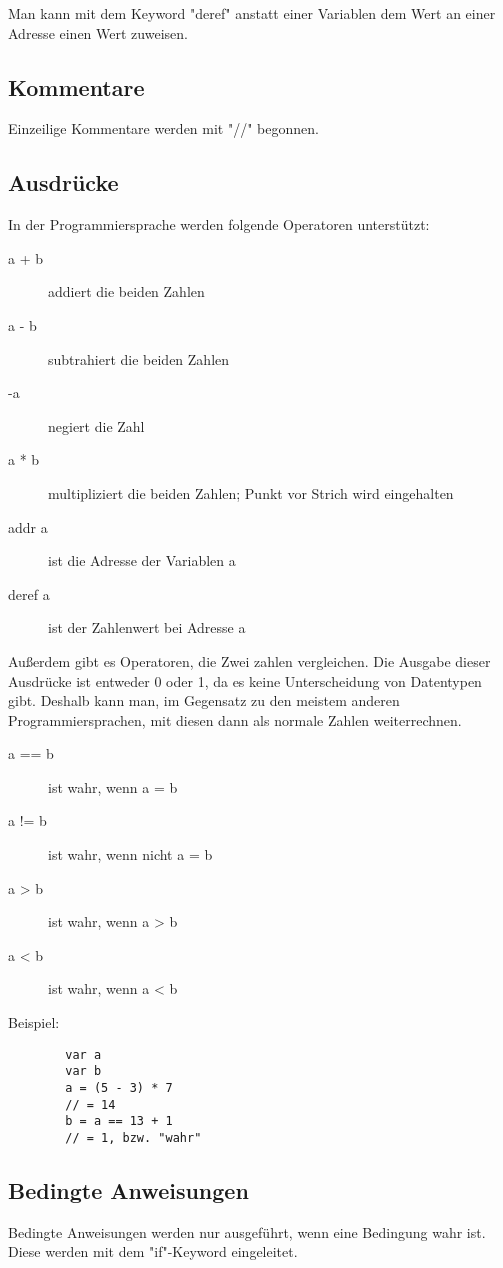 \documentclass[ngerman]{article}
\begin{document}
    Man kann mit dem Keyword "deref" anstatt einer Variablen dem
    Wert an einer Adresse einen Wert zuweisen.

    \subsection{Kommentare}
    Einzeilige Kommentare werden mit "//" begonnen.

    \subsection{Ausdrücke}
    In der Programmiersprache werden folgende Operatoren
    unterstützt:
    \begin{description}
        \item[a + b] addiert die beiden Zahlen
        \item[a - b] subtrahiert die beiden Zahlen
        \item[-a] negiert die Zahl
        \item[a * b] multipliziert die beiden Zahlen; Punkt vor
            Strich wird eingehalten
        \item[addr a] ist die Adresse der Variablen a
        \item[deref a] ist der Zahlenwert bei Adresse a
    \end{description}

    Außerdem gibt es Operatoren, die Zwei zahlen vergleichen. Die
    Ausgabe dieser Ausdrücke ist entweder 0 oder 1, da es keine
    Unterscheidung von Datentypen gibt. Deshalb kann man, im
    Gegensatz zu den meistem anderen Programmiersprachen, mit diesen
    dann als normale Zahlen weiterrechnen.
    \begin{description}
        \item[a == b] ist wahr, wenn a = b
        \item[a != b] ist wahr, wenn nicht a = b
        \item[a > b] ist wahr, wenn a > b
        \item[a < b] ist wahr, wenn a < b
    \end{description}

    Beispiel:
    \begin{lstlisting}
        var a
        var b
        a = (5 - 3) * 7
        // = 14
        b = a == 13 + 1
        // = 1, bzw. "wahr"
    \end{lstlisting}

    \subsection{Bedingte Anweisungen}
    Bedingte Anweisungen werden nur ausgeführt, wenn eine Bedingung
    wahr ist. Diese werden mit dem "if"-Keyword eingeleitet.
\end{document}
